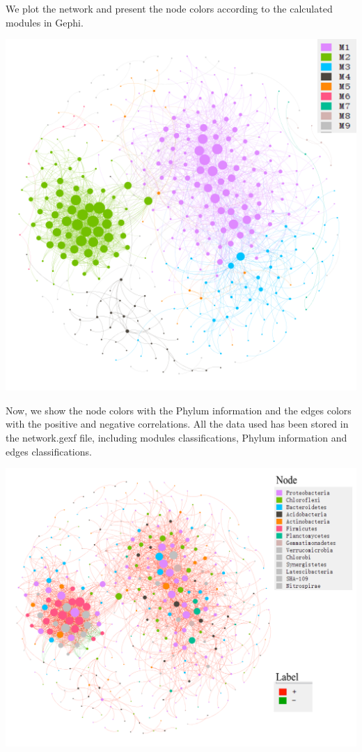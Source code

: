 \documentclass[
]{book}
\begin{document}
We plot the network and present the node colors according to the calculated modules in Gephi.

\begin{center}\includegraphics[width=550px]{Images/network1_spearman} \end{center}

Now, we show the node colors with the Phylum information and the edges colors with the positive and negative correlations.
All the data used has been stored in the network.gexf file, including modules classifications, Phylum information and edges classifications.

\begin{center}\includegraphics[width=550px]{Images/network2_spearman} \end{center}
\end{document}

